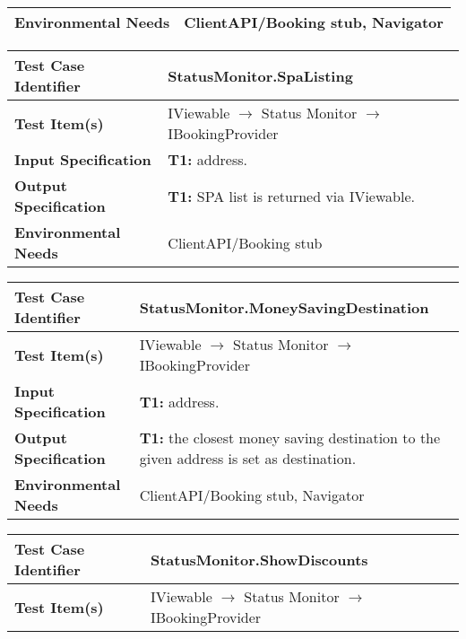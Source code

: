 {\begin{tabularx}{\textwidth}{l X}
    \textbf{Environmental Needs} & ClientAPI/Booking stub, Navigator\\
    \hline
\end{tabularx}
\bigskip 

\noindent
\begin{tabularx}{\textwidth}{l X}
    \hline 
    \textbf{Test Case Identifier} & StatusMonitor.SpaListing\\ 
    \hline 
    
    \textbf{Test Item(s)} & IViewable $\rightarrow$ Status Monitor $\rightarrow$ IBookingProvider\\
    \hline 
    
    \textbf{Input Specification} & \textbf{T1:} address.\\
    \hline 
    
    \textbf{Output Specification} & \textbf{T1:} SPA list is returned via IViewable. \\
    \hline 
    
    \textbf{Environmental Needs} & ClientAPI/Booking stub\\
    \hline
\end{tabularx}
\bigskip 

\noindent
\begin{tabularx}{\textwidth}{l X}
    \hline 
    \textbf{Test Case Identifier} & StatusMonitor.MoneySavingDestination\\ 
    \hline 
    
    \textbf{Test Item(s)} & IViewable $\rightarrow$ Status Monitor $\rightarrow$ IBookingProvider\\
    \hline 
    
    \textbf{Input Specification} & \textbf{T1:} address.\\
    \hline 
    
    \textbf{Output Specification} & \textbf{T1:} the closest money saving destination to the given address is set as destination.\\
    \hline 
    
    \textbf{Environmental Needs} & ClientAPI/Booking stub, Navigator\\
    \hline
\end{tabularx}
\bigskip 


\noindent
\begin{tabularx}{\textwidth}{l X}
    \hline 
    \textbf{Test Case Identifier} & StatusMonitor.ShowDiscounts\\ 
    \hline 
    
    \textbf{Test Item(s)} & IViewable $\rightarrow$ Status Monitor $\rightarrow$ IBookingProvider\\
    \hline 
    

\end{tabularx}}
